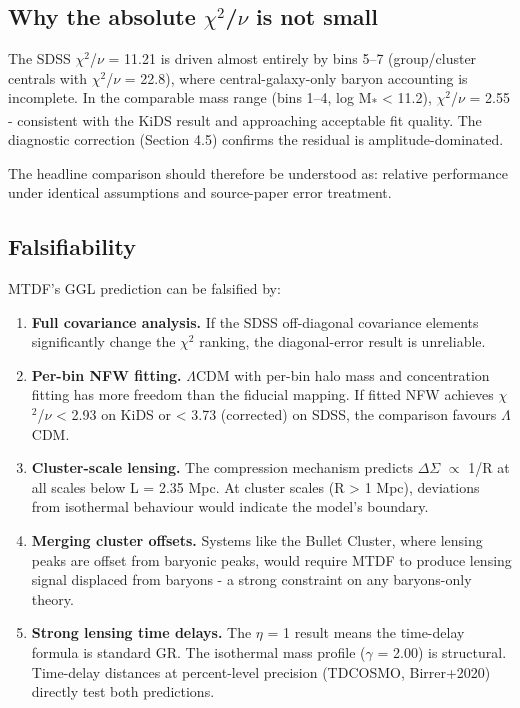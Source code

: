 \documentclass[11pt,a4paper]{article}
\begin{document}
\subsection{Why the absolute $\chi$$^{2}$/$\nu$ is not small}
The SDSS $\chi$$^{2}$/$\nu$ = 11.21 is driven almost entirely by bins 5--7 (group/\allowbreak{}cluster centrals with $\chi$$^{2}$/$\nu$ = 22.8), where central-galaxy-only baryon accounting is incomplete. In the comparable mass range (bins 1--4, log M\textsubscript{*} < 11.2), $\chi$$^{2}$/$\nu$ = 2.55  -  consistent with the KiDS result and approaching acceptable fit quality. The diagnostic correction (Section 4.5) confirms the residual is amplitude-dominated.

The headline comparison should therefore be understood as: relative performance under identical assumptions and source-paper error treatment.

\subsection{Falsifiability}
MTDF's GGL prediction can be falsified by:

\begin{enumerate}
  \item \textbf{Full covariance analysis.} If the SDSS off-diagonal covariance elements significantly change the $\chi$$^{2}$ ranking, the diagonal-error result is unreliable.
  \item \textbf{Per-bin NFW fitting.} $\Lambda$CDM with per-bin halo mass and concentration fitting has more freedom than the fiducial mapping. If fitted NFW achieves $\chi$$^{2}$/$\nu$ < 2.93 on KiDS or < 3.73 (corrected) on SDSS, the comparison favours $\Lambda$CDM.
  \item \textbf{Cluster-scale lensing.} The compression mechanism predicts $\Delta$$\Sigma$ $\propto$ 1/\allowbreak{}R at all scales below L = 2.35 Mpc. At cluster scales (R > 1 Mpc), deviations from isothermal behaviour would indicate the model's boundary.
  \item \textbf{Merging cluster offsets.} Systems like the Bullet Cluster, where lensing peaks are offset from baryonic peaks, would require MTDF to produce lensing signal displaced from baryons  -  a strong constraint on any baryons-only theory.
  \item \textbf{Strong lensing time delays.} The $\eta$ = 1 result means the time-delay formula is standard GR. The isothermal mass profile ($\gamma$ = 2.00) is structural. Time-delay distances at percent-level precision (TDCOSMO, Birrer+2020) directly test both predictions.
\end{enumerate}
\end{document}
